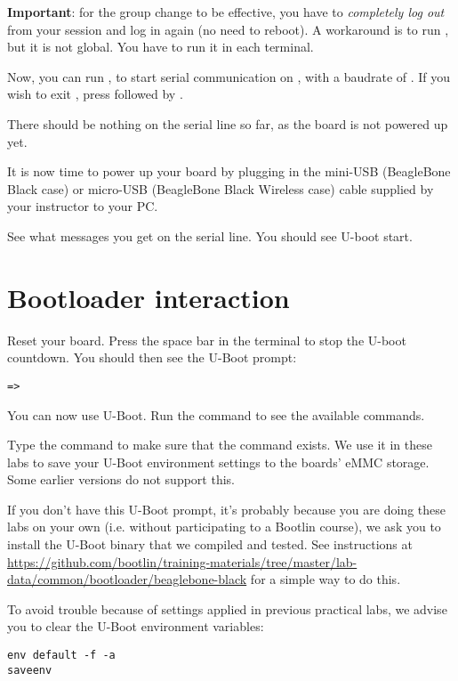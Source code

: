 {\bf Important}: for the group change to be effective, you have to
{\em completely log out} from your session and log in again (no need to
reboot). A workaround is to run , but it is not global.
You have to run it in each terminal.

Now, you can run , to start serial
communication on , with a baudrate of . If
you wish to exit , press \code{[Ctrl][a]} followed by
\code{[Ctrl][x]}.

There should be nothing on the serial line so far, as the board is not
powered up yet.

It is now time to power up your board by plugging in the mini-USB
(BeagleBone Black case) or micro-USB (BeagleBone Black Wireless case)
cable supplied by your instructor to your PC.

See what messages you get on the serial line. You should see U-boot
start.

\section{Bootloader interaction}

Reset your board. Press the space bar in the  terminal
to stop the U-boot countdown. You should then see the U-Boot prompt:

\begin{verbatim}
=>
\end{verbatim}

You can now use U-Boot. Run the  command to see the available
commands.

Type the  command to make sure that the
 command exists. We use it in these labs to
save your U-Boot environment settings to the boards' eMMC storage.
Some earlier versions do not support this.

If you don't have this U-Boot prompt, it's probably because you are doing these labs on your own
(i.e. without participating to a Bootlin course), we ask you to install the U-Boot binary
that we compiled and tested. See instructions at
\url{https://github.com/bootlin/training-materials/tree/master/lab-data/common/bootloader/beaglebone-black}
for a simple way to do this.

To avoid trouble because of settings applied in previous practical labs,
we advise you to clear the U-Boot environment variables:

\begin{verbatim}
env default -f -a
saveenv
\end{verbatim}

